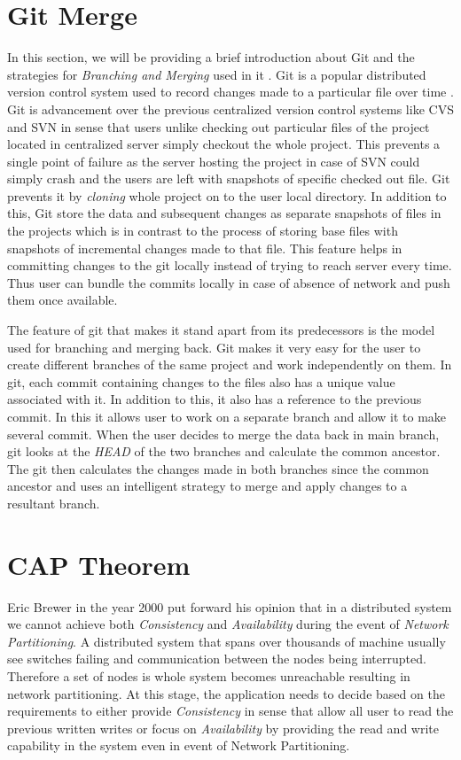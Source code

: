 \documentclass[12pt,a4paper,twoside,openright]{book}
\begin{document}
\section{Git Merge}
In this section, we will be providing a brief introduction about Git and the strategies for \textit{Branching and Merging} used in it \cite{gitmerge}. Git is a popular distributed version control system used to record changes made to a particular file over time \cite{gitVersionControl}. Git is advancement over the previous centralized version control systems like CVS \cite{cvs} and SVN \cite{svn} in sense that users unlike checking out particular files of the project located in centralized server simply checkout the whole project. This prevents a single point of failure as the server hosting the project in case of SVN could simply crash and the users are left with snapshots of specific checked out file. Git prevents it by \textit{cloning} whole project on to the user local directory. In addition to this, Git store the data and subsequent changes as separate snapshots of files in the projects which is in contrast to the process of storing base files with snapshots of incremental changes made to that file. This feature helps in committing changes to the git locally instead of trying to reach server every time. Thus user can bundle the commits locally in case of absence of network and push them once available.
\par The feature of git that makes it stand apart from its predecessors is the model used for branching and merging back. Git makes it very easy for the user to create different branches of the same project and work independently on them. In git, each commit containing changes to the files also has a unique value associated with it. In addition to this, it also has a reference to the previous commit. In this it allows user to work on a separate branch and allow it to make several commit. When the user decides to merge the data back in main branch, git looks at the \textit{HEAD} of the two branches and calculate the common ancestor. The git then calculates the changes made in both branches since the common ancestor and uses an intelligent strategy to merge and apply changes to a resultant branch. 


\section{CAP Theorem}
Eric Brewer in the year 2000 put forward his opinion that in a distributed system we cannot achieve both \textit{Consistency} and \textit{Availability} during the event of \textit{Network Partitioning}. A distributed system that spans over thousands of machine usually see switches failing and communication between the nodes being interrupted. Therefore a set of nodes is whole system becomes unreachable resulting in network partitioning. At this stage, the application needs to decide based on the requirements to either provide \textit{Consistency} in sense that allow all user to read the previous written writes or focus on \textit{Availability} by providing the read and write capability in the system even in event of Network Partitioning.
\end{document}
